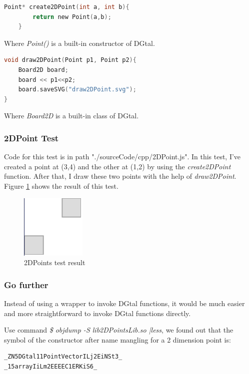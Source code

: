     \begin{lstlisting}[language=c, caption= create2DPoint]
    Point* create2DPoint(int a, int b){
        return new Point(a,b);
    }
    \end{lstlisting}
 Where \textit{Point()} is a built-in constructor of DGtal.   
    
    \begin{lstlisting}[language=c, caption= draw2DPoint]
    void draw2DPoint(Point p1, Point p2){
    Board2D board;
    board << p1<<p2;
    board.saveSVG("draw2DPoint.svg");
}
    \end{lstlisting}


Where \textit{Board2D} is a built-in class of DGtal.    

\subsubsection{2DPoint Test}
Code for this test is in path "./sourceCode/cpp/2DPoint.js". In this test, I've created a point at (3,4) and the other at (1,2) by using the \textit{create2DPoint} function. After that, I draw these two points with the help of \textit{draw2DPoint}. Figure \ref{fig:2DPointResult} shows the result of this test.

     \begin{figure}
        \centering
        \includegraphics[scale = 0.8]
        {Images/experiments/2DPointsResult.png}
        \caption[2DPoints test result]%
        {2DPoints test result}
        \label{fig:2DPointResult}
    \end{figure}
     
\subsubsection{Go further}     
 Instead of using a wrapper to invoke DGtal functions, it would be much easier and more straightforward to invoke DGtal functions directly.

Use command \textit{\$ objdump -S lib2DPointsLib.so |less}, we found out that the symbol of the constructor after name mangling for a 2 dimension point is:

\begin{lstlisting}
_ZN5DGtal11PointVectorILj2EiNSt3_
_15arrayIiLm2EEEEC1ERKiS6_
\end{lstlisting}

